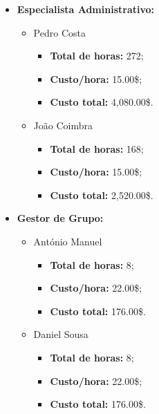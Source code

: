 \begin{itemize}
	\item \textbf{Especialista Administrativo:}
		\begin{itemize}
			\item Pedro Costa
				\begin{itemize}
					\item \textbf{Total de horas:} 272;
					\item \textbf{Custo/hora:} 15.00\$;
					\item \textbf{Custo total:} 4,080.00\$.
				\end{itemize}
			\item João Coimbra
				\begin{itemize}
					\item \textbf{Total de horas:} 168;
					\item \textbf{Custo/hora:} 15.00\$;
					\item \textbf{Custo total:} 2,520.00\$.
				\end{itemize}
		\end{itemize}

	\item \textbf{Gestor de Grupo:}
		\begin{itemize}
			\item António Manuel
				\begin{itemize}
					\item \textbf{Total de horas:} 8;
					\item \textbf{Custo/hora:} 22.00\$;
					\item \textbf{Custo total:} 176.00\$.
				\end{itemize}
			\item Daniel Sousa
				\begin{itemize}
					\item \textbf{Total de horas:} 8;
					\item \textbf{Custo/hora:} 22.00\$;
					\item \textbf{Custo total:} 176.00\$.
				\end{itemize}
		\end{itemize}
\end{itemize}

